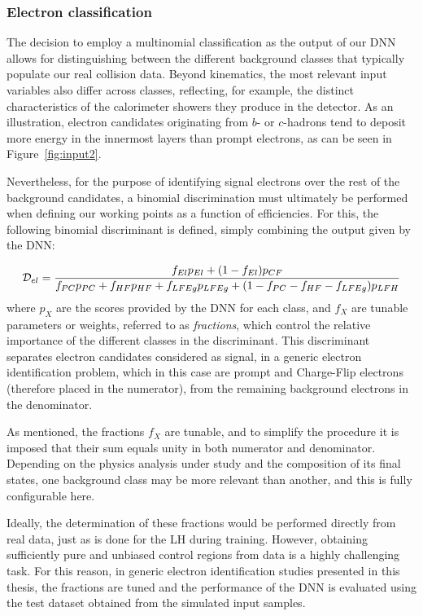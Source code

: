 \subsubsection{Electron classification}

The decision to employ a multinomial classification as the output of our DNN allows for distinguishing between the different background classes that typically populate our real collision data. Beyond kinematics, the most relevant input variables also differ across classes, reflecting, for example, the distinct characteristics of the calorimeter showers they produce in the detector. As an illustration, electron candidates originating from $b$- or $c$-hadrons tend to deposit more energy in the innermost layers than prompt electrons, as can be seen in Figure~\ref{fig:input2}.

Nevertheless, for the purpose of identifying signal electrons over the rest of the background candidates, a binomial discrimination must ultimately be performed when defining our working points as a function of efficiencies.  
For this, the following binomial discriminant is defined, simply combining the output given by the DNN:

\begin{equation}
  \small
  \mathcal{D}_{el} = \frac{f_{El}p_{El} + (1-f_{El})p_{CF}}{f_{PC}p_{PC}+f_{HF}p_{HF}+f_{LFEg}p_{LFEg}+(1-f_{PC}-f_{HF}-f_{LFEg})p_{LFH}}
\label{dnn_discriminant}
\end{equation}
where $p_{X}$ are the scores provided by the DNN for each class, and $f_{X}$ are tunable parameters or weights, referred to as \textit{fractions}, which control the relative importance of the different classes in the discriminant.  
This discriminant separates electron candidates considered as signal, in a generic electron identification problem, which in this case are prompt and Charge-Flip electrons (therefore placed in the numerator), from the remaining background electrons in the denominator.

As mentioned, the fractions $f_{X}$ are tunable, and to simplify the procedure it is imposed that their sum equals unity in both numerator and denominator. Depending on the physics analysis under study and the composition of its final states, one background class may be more relevant than another, and this is fully configurable here.

Ideally, the determination of these fractions would be performed directly from real data, just as is done for the LH during training. However, obtaining sufficiently pure and unbiased control regions from data is a highly challenging task.
For this reason, in generic electron identification studies presented in this thesis, the fractions are tuned and the performance of the DNN is evaluated using the test dataset obtained from the simulated input samples. 

